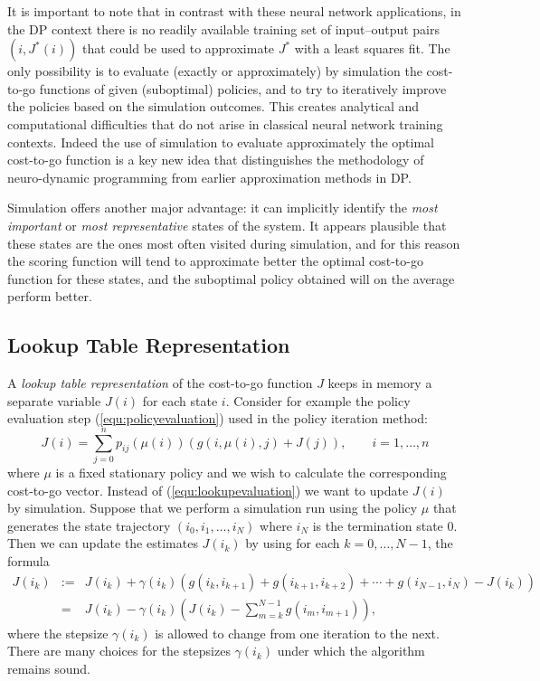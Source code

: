 It is important to note that in contrast with these neural network applications, in the DP context there is no readily available training set of input--output pairs $(i,J^*(i))$ that could be used to approximate $J^*$ with a least squares fit. The only possibility is to evaluate (exactly or approximately) by simulation the cost-to-go functions of given (suboptimal) policies, and to try to iteratively improve the policies based on the simulation outcomes. This creates analytical and computational difficulties that do not arise in classical neural network training contexts. Indeed the use of simulation to evaluate approximately the optimal cost-to-go function is a key new idea that distinguishes the methodology of neuro-dynamic programming from earlier approximation methods in DP.

Simulation offers another major advantage: it can implicitly identify the \emph{most important} or \emph{most representative} states of the system. It appears plausible that these states are the ones most often visited during simulation, and for this reason the scoring function will tend to approximate better the optimal cost-to-go function for these states, and the suboptimal policy obtained will on the average perform better.








\subsection{Lookup Table Representation}
\label{sec:lookuptable}
A \emph{lookup table representation} of the cost-to-go function $J$ keeps in memory a separate variable $J(i)$ for each state $i$. Consider for example the policy evaluation step (\ref{equ:policyevaluation}) used in the policy iteration method:
\begin{equation} \label{equ:lookupevaluation}
J(i) = \sum^n_{j=0} p_{ij}\left(\mu(i)\right)\left(g(i,\mu(i),j) + J(j)\right), \qquad i = 1,\ldots,n
\end{equation}
where $\mu$ is a fixed stationary policy and we wish to calculate the corresponding cost-to-go vector. Instead of (\ref{equ:lookupevaluation}) we want to update $J(i)$ by simulation. Suppose that we perform a simulation run using the policy $\mu$ that generates the state trajectory $(i_0,i_1,\ldots,i_N)$ where $i_N$ is the termination state 0. Then we can update the estimates $J(i_k)$ by using for each $k=0,\ldots,N-1$, the formula
\begin{eqnarray} \label{equ:simulation}
J(i_k) & := & J(i_k)+\gamma(i_k)\left( g(i_k,i_{k+1})+g(i_{k+1},i_{k+2})+\cdots+g(i_{N-1},i_N)- J(i_k)\right ) \nonumber \\
& = & J(i_k)-\gamma(i_k)\left( J(i_k) - \sum \limits_{m=k}^{N-1} g(i_m,i_{m+1}) \right),
\end{eqnarray}
where the stepsize $\gamma(i_k)$ is allowed to change from one iteration to the next. There are many choices for the stepsizes $\gamma(i_k)$ under which the algorithm remains sound.

